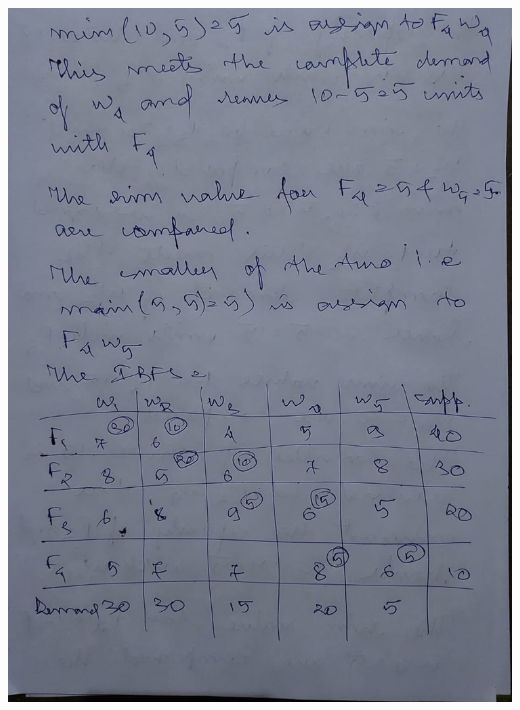 \documentclass[12pt, letterpaper, twoside]{book}
\begin{document}
\includegraphics[width=\paperwidth, height=\paperheight]{Page7}
\end{document}
